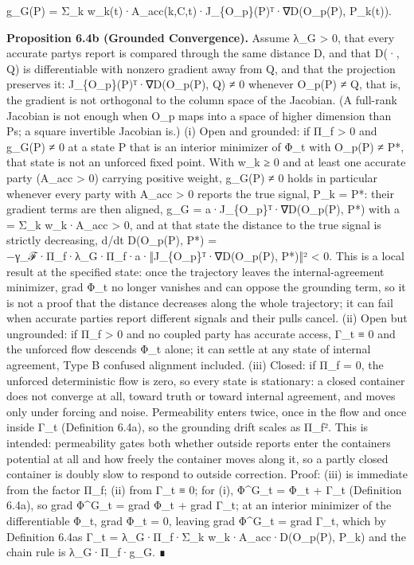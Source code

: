 \documentclass[
]{article}
\begin{document}
g\_G(P) = Σ\_k w\_k(t)·A\_acc(k,C,t)·J\_\{O\_p\}(P)ᵀ·∇D(O\_p(P),
P\_k(t)).

\textbf{Proposition 6.4b (Grounded Convergence).} Assume λ\_G
\textgreater{} 0, that every accurate party\textquotesingle s report is
compared through the same distance D, and that D(·, Q) is differentiable
with nonzero gradient away from Q, and that the projection preserves it:
J\_\{O\_p\}(P)ᵀ·∇D(O\_p(P), Q) ≠ 0 whenever O\_p(P) ≠ Q, that is, the
gradient is not orthogonal to the column space of the Jacobian. (A
full-rank Jacobian is not enough when O\_p maps into a space of higher
dimension than P\textquotesingle s; a square invertible Jacobian is.)
(i) Open and grounded: if Π\_f \textgreater{} 0 and g\_G(P) ≠ 0 at a
state P that is an interior minimizer of Φ\_t with O\_p(P) ≠ P*, that
state is not an unforced fixed point. With w\_k ≥ 0 and at least one
accurate party (A\_acc \textgreater{} 0) carrying positive weight,
g\_G(P) ≠ 0 holds in particular whenever every party with A\_acc
\textgreater{} 0 reports the true signal, P\_k = P*: their gradient
terms are then aligned, g\_G = a·J\_\{O\_p\}ᵀ·∇D(O\_p(P), P*) with a =
Σ\_k w\_k·A\_acc \textgreater{} 0, and at that state the distance to the
true signal is strictly decreasing, d/dt D(O\_p(P), P*) =
−γ\_ℱ·Π\_f·λ\_G·Π\_f·a·‖J\_\{O\_p\}ᵀ·∇D(O\_p(P), P*)‖² \textless{} 0.
This is a local result at the specified state: once the trajectory
leaves the internal-agreement minimizer, grad Φ\_t no longer vanishes
and can oppose the grounding term, so it is not a proof that the
distance decreases along the whole trajectory; it can fail when accurate
parties report different signals and their pulls cancel. (ii) Open but
ungrounded: if Π\_f \textgreater{} 0 and no coupled party has accurate
access, Γ\_t ≡ 0 and the unforced flow descends Φ\_t alone; it can
settle at any state of internal agreement, Type B confused alignment
included. (iii) Closed: if Π\_f = 0, the unforced deterministic flow is
zero, so every state is stationary: a closed container does not converge
at all, toward truth or toward internal agreement, and moves only under
forcing and noise. Permeability enters twice, once in the flow and once
inside Γ\_t (Definition 6.4a), so the grounding drift scales as Π\_f².
This is intended: permeability gates both whether outside reports enter
the container\textquotesingle s potential at all and how freely the
container moves along it, so a partly closed container is doubly slow to
respond to outside correction. Proof: (iii) is immediate from the factor
Π\_f; (ii) from Γ\_t ≡ 0; for (i), Φ\^{}G\_t = Φ\_t + Γ\_t (Definition
6.4a), so grad Φ\^{}G\_t = grad Φ\_t + grad Γ\_t; at an interior
minimizer of the differentiable Φ\_t, grad Φ\_t = 0, leaving grad
Φ\^{}G\_t = grad Γ\_t, which by Definition 6.4a\textquotesingle s Γ\_t =
λ\_G·Π\_f·Σ\_k w\_k·A\_acc·D(O\_p(P), P\_k) and the chain rule is
λ\_G·Π\_f·g\_G. ∎
\end{document}
